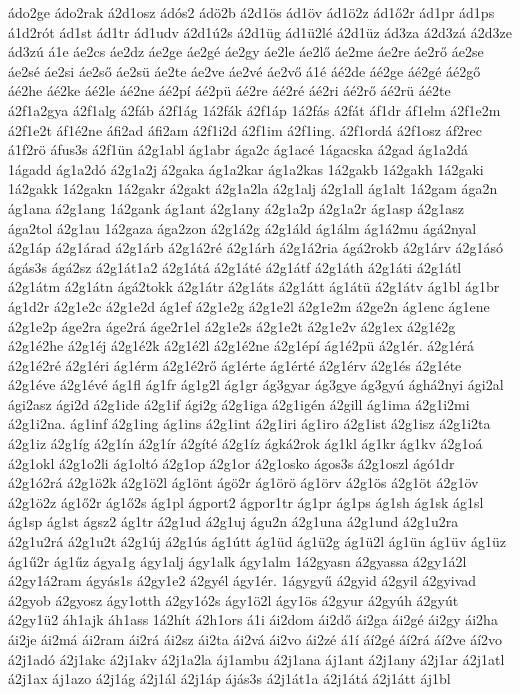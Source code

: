 {ádo2ge
ádo2rak
á2d1osz
ádós2
ádö2b
á2d1ös
ád1öv
ád1ö2z
ád1ő2r
ád1pr
ád1ps
á1d2rót
ád1st
ád1tr
ád1udv
á2d1ú2s
á2d1üg
ád1ü2lé
á2d1üz
ád3za
á2d3zá
á2d3ze
ád3zú
á1e
áe2cs
áe2dz
áe2ge
áe2gé
áe2gy
áe2le
áe2lő
áe2me
áe2re
áe2rő
áe2se
áe2sé
áe2si
áe2ső
áe2sü
áe2te
áe2ve
áe2vé
áe2vő
á1é
áé2de
áé2ge
áé2gé
áé2gő
áé2he
áé2ke
áé2le
áé2ne
áé2pí
áé2pü
áé2re
áé2ré
áé2ri
áé2rő
áé2rü
áé2te
á2f1a2gya
á2f1alg
á2fáb
á2f1ág
1á2fák
á2f1áp
1á2fás
á2fát
áf1dr
áf1elm
á2f1e2m
á2f1e2t
áf1é2ne
áfi2ad
áfi2am
á2f1i2d
á2f1im
á2f1ing.
á2f1ordá
á2f1osz
áf2rec
á1f2rö
áfus3s
á2f1ün
á2g1abl
ág1abr
ága2c
ág1acé
1ágacska
á2gad
ág1a2dá
1ágadd
ág1a2dó
á2g1a2j
á2gaka
ág1a2kar
ág1a2kas
1á2gakb
1á2gakh
1á2gaki
1á2gakk
1á2gakn
1á2gakr
á2gakt
á2g1a2la
á2g1alj
á2g1all
ág1alt
1á2gam
ága2n
ág1ana
á2g1ang
1á2gank
ág1ant
á2g1any
á2g1a2p
á2g1a2r
ág1asp
á2g1asz
ága2tol
á2g1au
1á2gaza
ága2zon
á2g1á2g
á2g1áld
ág1álm
ág1á2mu
ágá2nyal
á2g1áp
á2g1árad
á2g1árb
á2g1á2ré
á2g1árh
á2g1á2ria
ágá2rokb
á2g1árv
á2g1ásó
ágás3s
ágá2sz
á2g1át1a2
á2g1átá
á2g1áté
á2g1átf
á2g1áth
á2g1áti
á2g1átl
á2g1átm
á2g1átn
ágá2tokk
á2g1átr
á2g1áts
á2g1átt
ág1átü
á2g1átv
ág1bl
ág1br
ág1d2r
á2g1e2c
á2g1e2d
ág1ef
á2g1e2g
á2g1e2l
á2g1e2m
á2ge2n
ág1enc
ág1ene
á2g1e2p
áge2ra
áge2rá
áge2r1el
á2g1e2s
á2g1e2t
á2g1e2v
á2g1ex
á2g1é2g
á2g1é2he
á2g1éj
á2g1é2k
á2g1é2l
á2g1é2ne
á2g1épí
ág1é2pü
á2g1ér.
á2g1érá
á2g1é2ré
á2g1éri
ág1érm
á2g1é2rő
ág1érte
ág1érté
á2g1érv
á2g1és
á2g1éte
á2g1éve
á2g1évé
ág1fl
ág1fr
ág1g2l
ág1gr
ág3gyar
ág3gye
ág3gyú
ághá2nyi
ági2al
ági2asz
ági2d
á2g1ide
á2g1if
ági2g
á2g1iga
á2g1igén
á2gill
ág1ima
á2g1i2mi
á2g1i2na.
ág1inf
á2g1ing
ág1ins
á2g1int
á2g1iri
ág1iro
á2g1ist
á2g1isz
á2g1i2ta
á2g1iz
á2g1íg
á2g1ín
á2g1ír
á2gíté
á2g1íz
ágká2rok
ág1kl
ág1kr
ág1kv
á2g1oá
á2g1okl
á2g1o2li
ág1oltó
á2g1op
á2g1or
á2g1osko
ágos3s
á2g1oszl
ágó1dr
á2g1ó2rá
á2g1ö2k
á2g1ö2l
ág1önt
ágö2r
ág1örö
ág1örv
á2g1ös
á2g1öt
á2g1öv
á2g1ö2z
ág1ő2r
ág1ő2s
ág1pl
ágport2
ágpor1tr
ág1pr
ág1ps
ág1sh
ág1sk
ág1sl
ág1sp
ág1st
ágsz2
ág1tr
á2g1ud
á2g1uj
águ2n
á2g1una
á2g1und
á2g1u2ra
á2g1u2rá
á2g1u2t
á2g1új
á2g1ús
ág1útt
ág1üd
ág1ü2g
ág1ü2l
ág1ün
ág1üv
ág1üz
ág1ű2r
ág1űz
ágya1g
ágy1alj
ágy1alk
ágy1alm
1á2gyasn
á2gyassa
á2gy1á2l
á2gy1á2ram
ágyás1s
á2gy1e2
á2gyél
ágy1ér.
1ágygyű
á2gyid
á2gyil
á2gyivad
á2gyob
á2gyosz
ágy1otth
á2gy1ó2s
ágy1ö2l
ágy1ös
á2gyur
á2gyúh
á2gyút
á2gy1ü2
áh1ajk
áh1ass
1á2hít
á2h1ors
á1i
ái2dom
ái2dő
ái2ga
ái2gé
ái2gy
ái2ha
ái2je
ái2má
ái2ram
ái2rá
ái2sz
ái2ta
ái2vá
ái2vo
ái2zé
á1í
áí2gé
áí2rá
áí2ve
áí2vo
á2j1adó
á2j1akc
á2j1akv
á2j1a2la
áj1ambu
á2j1ana
áj1ant
á2j1any
á2j1ar
á2j1atl
á2j1ax
áj1azo
á2j1ág
á2j1ál
á2j1áp
ájás3s
á2j1át1a
á2j1átá
á2j1átt
áj1bl
}
